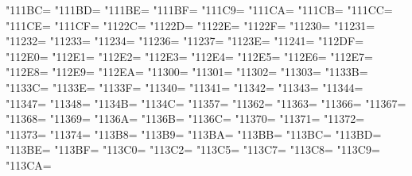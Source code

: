 \XeTeXcharclass"111BC=\KclassCM
\XeTeXcharclass"111BD=\KclassCM
\XeTeXcharclass"111BE=\KclassCM
\XeTeXcharclass"111BF=\KclassCM
\XeTeXcharclass"111C9=\KclassCM
\XeTeXcharclass"111CA=\KclassCM
\XeTeXcharclass"111CB=\KclassCM
\XeTeXcharclass"111CC=\KclassCM
\XeTeXcharclass"111CE=\KclassCM
\XeTeXcharclass"111CF=\KclassCM
\XeTeXcharclass"1122C=\KclassCM
\XeTeXcharclass"1122D=\KclassCM
\XeTeXcharclass"1122E=\KclassCM
\XeTeXcharclass"1122F=\KclassCM
\XeTeXcharclass"11230=\KclassCM
\XeTeXcharclass"11231=\KclassCM
\XeTeXcharclass"11232=\KclassCM
\XeTeXcharclass"11233=\KclassCM
\XeTeXcharclass"11234=\KclassCM
\XeTeXcharclass"11236=\KclassCM
\XeTeXcharclass"11237=\KclassCM
\XeTeXcharclass"1123E=\KclassCM
\XeTeXcharclass"11241=\KclassCM
\XeTeXcharclass"112DF=\KclassCM
\XeTeXcharclass"112E0=\KclassCM
\XeTeXcharclass"112E1=\KclassCM
\XeTeXcharclass"112E2=\KclassCM
\XeTeXcharclass"112E3=\KclassCM
\XeTeXcharclass"112E4=\KclassCM
\XeTeXcharclass"112E5=\KclassCM
\XeTeXcharclass"112E6=\KclassCM
\XeTeXcharclass"112E7=\KclassCM
\XeTeXcharclass"112E8=\KclassCM
\XeTeXcharclass"112E9=\KclassCM
\XeTeXcharclass"112EA=\KclassCM
\XeTeXcharclass"11300=\KclassCM
\XeTeXcharclass"11301=\KclassCM
\XeTeXcharclass"11302=\KclassCM
\XeTeXcharclass"11303=\KclassCM
\XeTeXcharclass"1133B=\KclassCM
\XeTeXcharclass"1133C=\KclassCM
\XeTeXcharclass"1133E=\KclassCM
\XeTeXcharclass"1133F=\KclassCM
\XeTeXcharclass"11340=\KclassCM
\XeTeXcharclass"11341=\KclassCM
\XeTeXcharclass"11342=\KclassCM
\XeTeXcharclass"11343=\KclassCM
\XeTeXcharclass"11344=\KclassCM
\XeTeXcharclass"11347=\KclassCM
\XeTeXcharclass"11348=\KclassCM
\XeTeXcharclass"1134B=\KclassCM
\XeTeXcharclass"1134C=\KclassCM
\XeTeXcharclass"11357=\KclassCM
\XeTeXcharclass"11362=\KclassCM
\XeTeXcharclass"11363=\KclassCM
\XeTeXcharclass"11366=\KclassCM
\XeTeXcharclass"11367=\KclassCM
\XeTeXcharclass"11368=\KclassCM
\XeTeXcharclass"11369=\KclassCM
\XeTeXcharclass"1136A=\KclassCM
\XeTeXcharclass"1136B=\KclassCM
\XeTeXcharclass"1136C=\KclassCM
\XeTeXcharclass"11370=\KclassCM
\XeTeXcharclass"11371=\KclassCM
\XeTeXcharclass"11372=\KclassCM
\XeTeXcharclass"11373=\KclassCM
\XeTeXcharclass"11374=\KclassCM
\XeTeXcharclass"113B8=\KclassCM
\XeTeXcharclass"113B9=\KclassCM
\XeTeXcharclass"113BA=\KclassCM
\XeTeXcharclass"113BB=\KclassCM
\XeTeXcharclass"113BC=\KclassCM
\XeTeXcharclass"113BD=\KclassCM
\XeTeXcharclass"113BE=\KclassCM
\XeTeXcharclass"113BF=\KclassCM
\XeTeXcharclass"113C0=\KclassCM
\XeTeXcharclass"113C2=\KclassCM
\XeTeXcharclass"113C5=\KclassCM
\XeTeXcharclass"113C7=\KclassCM
\XeTeXcharclass"113C8=\KclassCM
\XeTeXcharclass"113C9=\KclassCM
\XeTeXcharclass"113CA=\KclassCM
